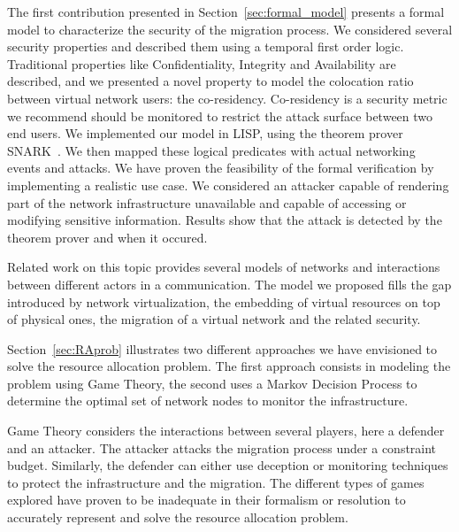 The first contribution presented in Section~\ref{sec:formal_model} presents a formal model to characterize the security of the migration process. We considered several security properties and described them using a temporal first order logic. Traditional properties like Confidentiality, Integrity and Availability are described, and we presented a novel property to model the colocation ratio between virtual network users: the co-residency. Co-residency is a security metric we recommend should be monitored to restrict the attack surface between two end users.
We implemented our model in LISP, using the theorem prover SNARK~\cite{snark-Stickel2000}.
We then mapped these logical predicates with actual networking events and attacks.
We have proven the feasibility of the formal verification by implementing a realistic use case.
We considered an attacker capable of rendering part of the network infrastructure unavailable and capable of accessing or modifying sensitive information.
Results show that the attack is detected by the theorem prover and when it occured.

Related work on this topic provides several models of networks and interactions between different actors in a communication. The model we proposed fills the gap introduced by network virtualization, the embedding of virtual resources on top of physical ones, the migration of a virtual network and the related security. 

Section~\ref{sec:RAprob} illustrates two different approaches we have envisioned to solve the resource allocation problem. The first approach consists in modeling the problem using Game Theory, the second uses a Markov Decision Process to determine the optimal set of network nodes to monitor the infrastructure.

Game Theory considers the interactions between several players, here a defender and an attacker.
The attacker attacks the migration process under a constraint budget. Similarly, the defender can either use deception or monitoring techniques to protect the infrastructure and the migration.
The different types of games explored have proven to be inadequate in their formalism or resolution to accurately represent and solve the resource allocation problem.

